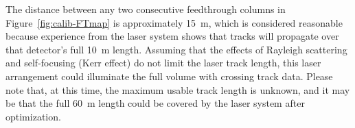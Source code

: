 The distance between any two consecutive feedthrough columns in Figure~\ref{fig:calib-FTmap} is approximately \SI{15}{\m}, which is considered reasonable because experience from the  laser system shows that tracks will propagate over that detector's full \SI{10}{\m} length. Assuming that the effects of Rayleigh scattering and self-focusing (Kerr effect) do not limit the laser track length, this laser arrangement could illuminate the full volume with crossing track data.  Please note that, at this time, the maximum usable track length is unknown, and it may be that the full \SI{60}{\m} \detmodule length could be covered by the laser system after optimization.
